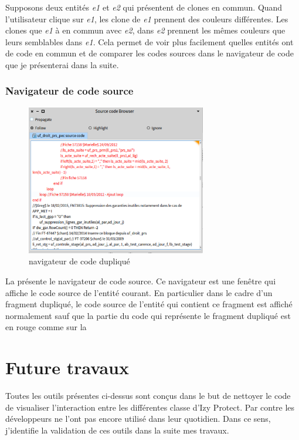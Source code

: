 \documentclass[a4paper]{article}
\begin{document}
Supposons deux entités \textit{e1} et \textit{e2} qui présentent de clones en commun.
Quand l'utilisateur clique sur \textit{e1}, les clone de \textit{e1} prennent des couleurs différentes.
Les clones que \textit{e1} à en commun avec \textit{e2}, dans \textit{e2} prennent les mêmes couleurs que leurs semblables dans \textit{e1}.
Cela permet de voir plus facilement quelles entités ont de code en commun et de comparer les codes sources dans le navigateur de code que je présenterai dans la suite. 
\subsubsection{Navigateur de code source}

\begin{figure}[htbp]
  \begin{center}
  \includegraphics[width=0.7\textwidth]{./figures/sourceCodeBrowser.png}
  \caption{navigateur de code dupliqué}
  \label{fig:sourceCodeBrowser}
\end{center}
\vspace{-0.3cm}
\end{figure}
La  présente le navigateur de code source. 
Ce navigateur est une fenêtre qui affiche le code source de l'entité courant.
En particulier dans le cadre d'un fragment dupliqué, le code source de l'entité qui contient ce fragment est affiché normalement sauf que la partie du code qui représente le fragment dupliqué est en rouge comme sur la 

\section{Future travaux}
\label{sec:roadmap}
Toutes les outils présentes ci-dessus sont conçus dans le but de nettoyer le code de visualiser l'interaction entre les différentes classe d'Izy Protect.
Par contre les développeurs ne l'ont pas encore utilisé dans leur quotidien.
Dans ce sens, j'identifie la validation de ces outils dans la suite mes travaux.
\end{document}

